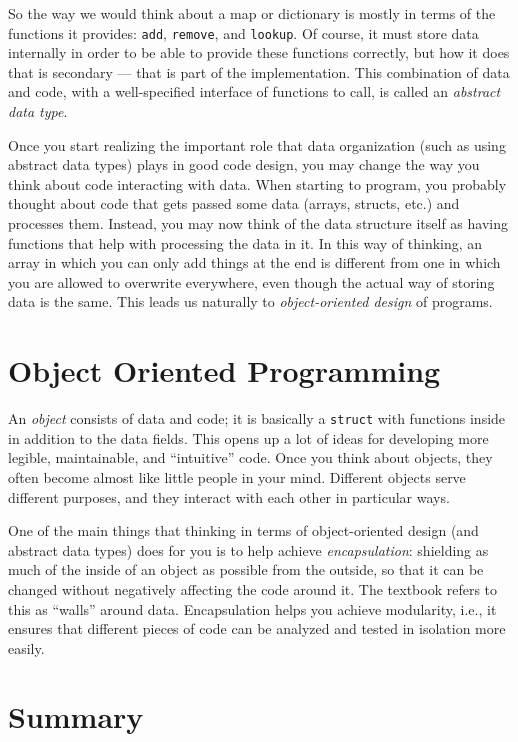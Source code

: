 So the way we would think about a map or dictionary is mostly in terms
of the functions it provides:
\texttt{add}, \texttt{remove}, and \texttt{lookup}.
Of course, it must store data internally in order to be
able to provide these functions correctly, but how it does that is
secondary --- that is part of the implementation.
This combination of data and code, with a well-specified interface of
functions to call, is called an \emph{abstract data type}.

Once you start realizing the important role that data organization
(such as using abstract data types) plays in good code design,
you may change the way you think about code interacting with data.
When starting to program, you probably thought about code that gets
passed some data (arrays, structs, etc.) and processes them.
Instead, you may now think of the data structure itself as having functions
that help with processing the data in it. 
In this way of thinking, an array in which you can only add things at
the end is different from one in which you are allowed to overwrite
everywhere, even though the actual way of storing data is the same.
This leads us naturally to \emph{object-oriented design} of programs. 

\section{Object Oriented Programming}

An \emph{object} consists of data and code; it is basically a
\texttt{struct} with functions inside in addition to the data fields. 
This opens up a lot of ideas for developing more legible,
maintainable, and ``intuitive'' code.
Once you think about objects, they often become almost like little
people in your mind.
Different objects serve different purposes,
and they interact with each other in particular ways.

One of the main things that thinking in terms of object-oriented
design (and abstract data types) does for you is to help achieve 
\emph{encapsulation}: shielding as much of the inside of an object as
possible from the outside, so that it can be changed without
negatively affecting the code around it.
The textbook refers to this as ``walls'' around data.
Encapsulation helps you achieve modularity, i.e., it ensures that
different pieces of code can be analyzed and tested in isolation more 
easily.

\section{Summary}

